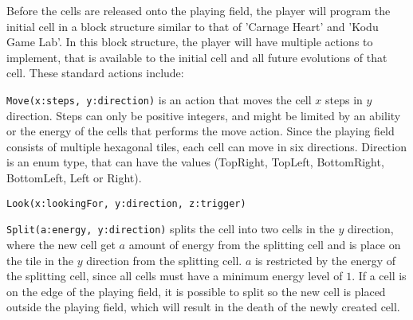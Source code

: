 Before the cells are released onto the playing field, the player will program the initial cell in a block structure similar to that of 'Carnage Heart' and 'Kodu Game Lab'.
In this block structure, the player will have multiple actions to implement, that is available to the initial cell and all future evolutions of that cell.
These standard actions include:\newline

\verb|Move(x:steps, y:direction)| is an action that moves the cell $x$ steps in $y$ direction.
Steps can only be positive integers, and might be limited by an ability or the energy of the cells that performs the move action.
Since the playing field consists of multiple hexagonal tiles, each cell can move in six directions.
Direction is an enum type, that can have the values (TopRight, TopLeft, BottomRight, BottomLeft, Left or Right).\newline

\verb|Look(x:lookingFor, y:direction, z:trigger)|\newline 



\verb|Split(a:energy, y:direction)| splits the cell into two cells in the $y$ direction, where the new cell get $a$ amount of energy from the splitting cell and is place on the tile in the $y$ direction from the splitting cell.
$a$ is restricted by the energy of the splitting cell, since all cells must have a minimum energy level of $1$.
If a cell is on the edge of the playing field, it is possible to split so the new cell is placed outside the playing field, which will result in the death of the newly created cell.
